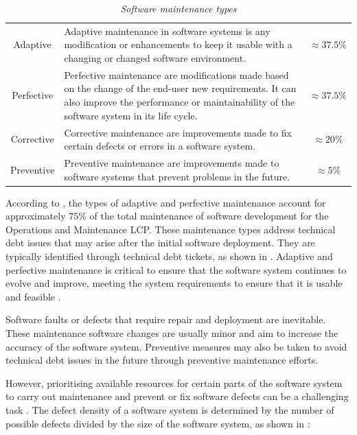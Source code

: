 \begin{table}[!htb]
	\centering
	\caption[Software maintenance types]
	{\textit{Software maintenance types \cite{Ping2010,Hasan2012}}}
	\label{tbl:ch1_maintenanceTypes}
	\begin{tabularx}{\textwidth}{cXc}
		\toprule
		\thead{Maintenance type} & \thead{Description} & \thead{$\%$ of maintenance activities} \\ 
		\midrule

		\rowcolor{lightgray}
		Adaptive & \raggedright Adaptive maintenance in software systems is any modification or enhancements to keep it usable with a changing or changed software environment. & $\approx 37.5\%$ \\ 

		Perfective & \raggedright Perfective maintenance are modifications made based on the change of the end-user new requirements. It can also improve the performance or maintainability of the software system in its life cycle. & $\approx 37.5\%$ \\ 
		
		\rowcolor{lightgray}
		Corrective & \raggedright Corrective maintenance are improvements made to fix certain defects or errors in a software system. & $\approx 20\%$ \\ 

		\rowcolor{lightgray}
		Preventive & \raggedright  Preventive maintenance are improvements made to software systems that prevent problems in the future. & $\approx 5\%$ \\ 
		\bottomrule
	\end{tabularx}
\end{table}

According to , the types of adaptive and perfective maintenance account for approximately $75\%$ of the total maintenance of software development for the Operations and Maintenance LCP. These maintenance types address technical debt issues that may arise after the initial software deployment. They are typically identified through technical debt tickets, as shown in . Adaptive and perfective maintenance is critical to ensure that the software system continues to evolve and improve, meeting the system requirements to ensure that it is usable and feasible \cite{Kumar2013}.\par Software faults or defects that require repair and deployment are inevitable. These maintenance software changes are usually minor and aim to increase the accuracy of the software system. Preventive measures may also be taken to avoid technical debt issues in the future through preventive maintenance efforts. \par However, prioritising available resources for certain parts of the software system to carry out maintenance and prevent or fix software defects can be a challenging task \cite{Mamone1994, Hasan2012}. The defect density of a software system is determined by the number of possible defects divided by the size of the software system, as shown in :

